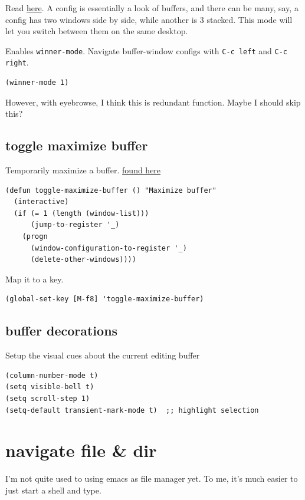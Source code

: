 \documentclass[11pt]{article}
\begin{document}
Read \href{https://www.emacswiki.org/emacs/WinnerMode}{here}. A config is essentially a look of buffers, and there can be
many, say, a config has two windows side by side, while another is 3
stacked. This mode will let you switch between them on the same desktop.

Enables \texttt{winner-mode}. Navigate buffer-window configs with \texttt{C-c left} and
\texttt{C-c right}.

\begin{verbatim}
(winner-mode 1)
\end{verbatim}

However, with eyebrowse, I think this is redundant function. Maybe I should skip this?

\subsection{toggle maximize buffer}
\label{sec:org9bd2440}

Temporarily maximize a buffer.  \href{https://gist.github.com/mads379/3402786}{found here}

\begin{verbatim}
(defun toggle-maximize-buffer () "Maximize buffer"
  (interactive)
  (if (= 1 (length (window-list)))
      (jump-to-register '_)
    (progn
      (window-configuration-to-register '_)
      (delete-other-windows))))
\end{verbatim}

Map it to a key.

\begin{verbatim}
(global-set-key [M-f8] 'toggle-maximize-buffer)
\end{verbatim}

\subsection{buffer decorations}
\label{sec:org97e4641}
Setup the visual cues about the current editing buffer
\begin{verbatim}
(column-number-mode t)
(setq visible-bell t)
(setq scroll-step 1)
(setq-default transient-mark-mode t)  ;; highlight selection
\end{verbatim}
\section{navigate file \& dir}
\label{sec:orgd164413}

I'm not quite used to using emacs as file manager yet. To me, it's
much easier to just start a shell and type.
\end{document}
